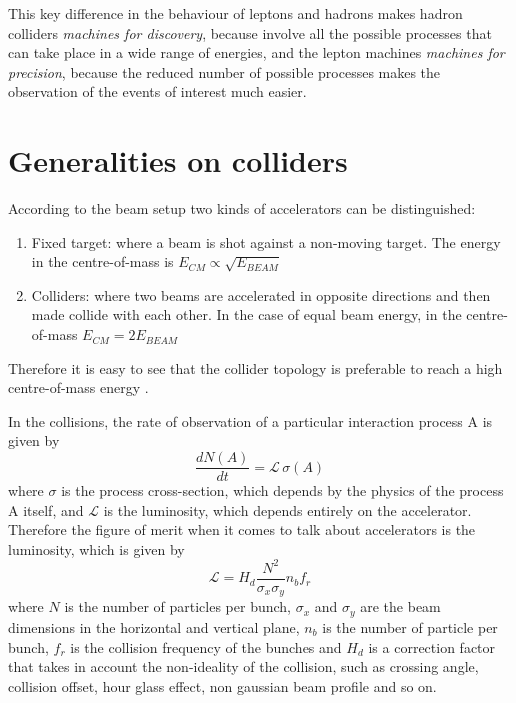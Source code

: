 This key difference in the behaviour of leptons and hadrons makes hadron colliders \textit{machines for discovery}, because involve all the possible processes that can take place in a wide range of energies, and the lepton machines \textit{machines for precision}, because the reduced number of possible processes makes the observation of the events of interest much easier.

\section{Generalities on colliders}

According to the beam setup two kinds of accelerators can be distinguished: 
\begin{enumerate}
\item Fixed target: where a beam is shot against a non-moving target. The energy in the centre-of-mass is $E_{CM} \propto \sqrt{E_{BEAM}}$
\item Colliders: where two beams are accelerated in opposite directions and then made collide with each other. In the case of equal beam energy, in the centre-of-mass $E_{CM} = 2 E_{BEAM}$
\end{enumerate}
Therefore it is easy to see that the collider topology is preferable to reach a high centre-of-mass energy .

In the collisions, the rate of observation of a particular interaction process A is given by
\begin{equation}
\frac{dN(A)}{dt} = \mathscr{L} \, \sigma(A)
\end{equation}
where $\sigma$ is the process cross-section, which depends by the physics of the process A itself, and $\mathscr{L}$ is the luminosity, which depends entirely on the accelerator.
Therefore the figure of merit when it comes to talk about accelerators is the luminosity, which is given by
\begin{equation}
\mathscr{L} = H_d \frac{N^2}{\sigma_x \sigma_y} n_b f_r
\end{equation}
where $N$ is the number of particles per bunch, $\sigma_x$ and $\sigma_y$ are the beam dimensions in the horizontal and vertical plane, $n_b$ is the number of particle per bunch, $f_r$ is the collision frequency of the bunches and $H_d$ is a correction factor that takes in account the non-ideality of the collision, such as crossing angle, collision offset, hour glass effect, non gaussian beam profile and so on.

